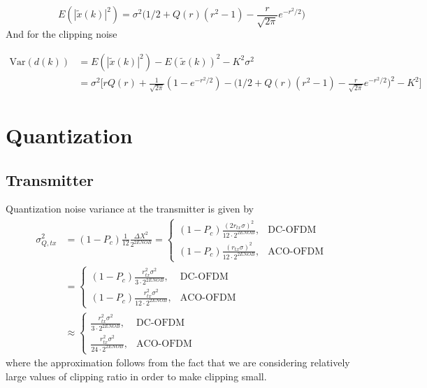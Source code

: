 \documentclass[a4paper]{article}
\begin{document}
\begin{equation}
E(|\tilde{x}(k)|^2) = \sigma^2\Big(1/2 + Q(r)(r^2 - 1) -  \frac{r}{\sqrt{2\pi}}e^{-r^2/2}\Big)
\end{equation}
And for the clipping noise

\begin{align} \nonumber
\mathrm{Var}(d(k)) & = E(|\tilde{x}(k)|^2) - E(\tilde{x}(k))^2 - K^2\sigma^2 \\ \nonumber
& = \sigma^2\bigg[rQ(r) + \frac{1}{\sqrt{2\pi}}(1 - e^{-r^2/2}) - \Big(1/2 + Q(r)(r^2 - 1) -  \frac{r}{\sqrt{2\pi}}e^{-r^2/2} \Big)^2 - K^2\bigg]
\end{align}

\section{Quantization}
\subsection{Transmitter}
Quantization noise variance at the transmitter is given by
\begin{align} \nonumber
\sigma^2_{Q, tx} &= (1-P_c)\frac{1}{12}\frac{\Delta X^2}{2^{2ENOB}} = \begin{cases}
(1-P_c)\frac{(2r_{tx}\sigma)^2}{12\cdot 2^{2ENOB}}, &\text{DC-OFDM} \\ 
(1-P_c)\frac{(r_{tx}\sigma)^2}{12\cdot 2^{2ENOB}}, &\text{ACO-OFDM}
\end{cases} \\ \nonumber
& =\begin{cases}
(1-P_c)\frac{r_{tx}^2\sigma^2}{3\cdot 2^{2ENOB}}, &\text{DC-OFDM} \\ 
(1-P_c)\frac{r_{tx}^2\sigma^2}{12\cdot 2^{2ENOB}}, &\text{ACO-OFDM}
\end{cases} \\ 
& \approx\begin{cases}
\frac{r_{tx}^2\sigma^2}{3\cdot 2^{2ENOB}}, &\text{DC-OFDM} \\ 
\frac{r_{tx}^2\sigma^2}{24\cdot 2^{2ENOB}}, &\text{ACO-OFDM}
\end{cases}
\end{align}
where the approximation follows from the fact that we are considering relatively large values of clipping ratio in order to make clipping small.
\end{document}
